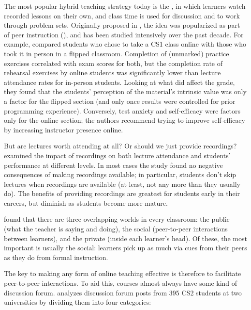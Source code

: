 The most popular hybrid teaching strategy today is the
, in which learners
watch recorded lessons on their own, and class time is used for
discussion and to work through problem sets. Originally proposed in
\cite{King1993}, the idea was popularized as part of peer instruction
(), and has been studied intensively over
the past decade. For example, \cite{Camp2016} compared students who
chose to take a CS1 class online with those who took it in person in a
flipped classroom. Completion of (unmarked) practice exercises
correlated with exam scores for both, but the completion rate of
rehearsal exercises by online students was significantly lower than
lecture attendance rates for in-person students. Looking at what did
affect the grade, they found that the students' perception of the
material's intrinsic value was only a factor for the flipped section
(and only once results were controlled for prior programming
experience). Conversely, test anxiety and self-efficacy were factors
only for the online section; the authors recommend trying to improve
self-efficacy by increasing instructor presence online.

But are lectures worth attending at all? Or should we just provide
recordings? \cite{Nord2017} examined the impact of recordings on both
lecture attendance and students' performance at different levels. In
most cases the study found no negative consequences of making recordings
available; in particular, students don't skip lectures when recordings
are available (at least, not any more than they usually do). The
benefits of providing recordings are greatest for students early in
their careers, but diminish as students become more mature.


\cite{Nuth2007} found that there are three overlapping worlds in
every classroom: the public (what the teacher is saying and doing), the
social (peer-to-peer interactions between learners), and the private
(inside each learner's head). Of these, the most important is usually
the social: learners pick up as much via cues from their peers as they
do from formal instruction.

The key to making any form of online teaching effective is therefore to
facilitate peer-to-peer interactions. To aid this, courses almost always
have some kind of discussion forum. \cite{Vell2017} analyzes
discussion forum posts from 395 CS2 students at two universities by
dividing them into four categories:

